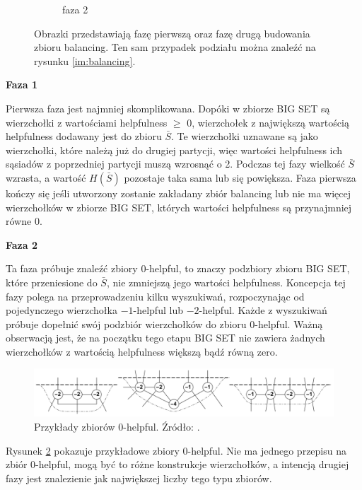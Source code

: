 \begin{figure}[h]
\begin{subfigure}{.32\textwidth}
    \caption[short]{faza 2}
\end{subfigure}
\caption{Obrazki przedstawiają fazę pierwszą oraz fazę drugą budowania zbioru balancing.
Ten sam przypadek podziału można znaleźć na rysunku \ref{im:balancing}.}
\label{im:balancing:details}
\end{figure}

\textbf{Faza 1}

Pierwsza faza jest najmniej skomplikowana.
Dopóki w zbiorze BIG SET są wierzchołki z wartościami helpfulness $\geq$ $0$, wierzchołek z największą wartością
helpfulness dodawany jest do zbioru $\bar{S}$.
Te wierzchołki uznawane są jako wierzchołki, które należą już do drugiej partycji, więc wartości helpfulness
ich sąsiadów z poprzedniej partycji muszą wzrosnąć o 2.
Podczas tej fazy wielkość $\bar{S}$ wzrasta, a wartość $H(\bar{S})$ pozostaje taka sama lub się powiększa.
Faza pierwsza kończy się jeśli utworzony zostanie zakładany zbiór balancing lub nie ma więcej wierzchołków
w zbiorze BIG SET, których wartości helpfulness są przynajmniej równe $0$.

\vspace{8mm}
\textbf{Faza 2}

Ta faza próbuje znaleźć zbiory $0$-helpful, to znaczy podzbiory zbioru BIG SET, które przeniesione do $\bar{S}$,
nie zmniejszą jego wartości helpfulness.
Koncepcja tej fazy polega na przeprowadzeniu kilku wyszukiwań, rozpoczynając od pojedynczego wierzchołka
$-1$-helpful lub $-2$-helpful.
Każde z wyszukiwań próbuje dopełnić swój podzbiór wierzchołków do zbioru $0$-helpful.
Ważną obserwacją jest, że na początku tego etapu BIG SET nie zawiera żadnych wierzchołków z wartością
helpfulness większą bądź równą zero.

\begin{figure}[h]
    \centering
    \includegraphics[width=0.95\linewidth]{images/0-helpful-sets}
    \caption{Przykłady zbiorów 0-helpful. Źródło: \cite{article}.}
    \label{im:0-helpful}
\end{figure}

Rysunek \ref{im:0-helpful} pokazuje przykładowe zbiory $0$-helpful.
Nie ma jednego przepisu na zbiór $0$-helpful, mogą być to różne konstrukcje wierzchołków, a intencją drugiej fazy
jest znalezienie jak największej liczby tego typu zbiorów.

